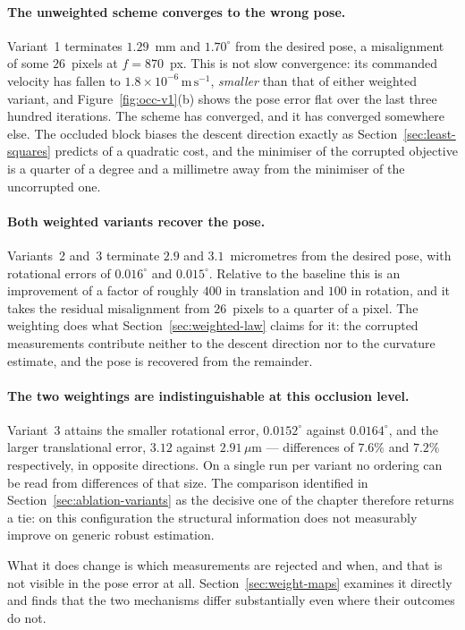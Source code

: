 \paragraph{The unweighted scheme converges to the wrong pose.}
Variant~1 terminates $1.29$~mm and $1.70^{\circ}$ from the desired pose, a
misalignment of some $26$~pixels at $f=870$~px. This is not slow convergence:
its commanded velocity has fallen to $1.8\times10^{-6}\,\mathrm{m\,s^{-1}}$,
\emph{smaller} than that of either weighted variant, and
Figure~\ref{fig:occ-v1}(b) shows the pose error flat over the last three
hundred iterations. The scheme has converged, and it has converged somewhere
else. The occluded block biases the descent direction exactly as
Section~\ref{sec:least-squares} predicts of a quadratic cost, and the
minimiser of the corrupted objective is a quarter of a degree and a millimetre
away from the minimiser of the uncorrupted one.

\paragraph{Both weighted variants recover the pose.}
Variants~2 and~3 terminate $2.9$ and $3.1$~micrometres from the desired pose,
with rotational errors of $0.016^{\circ}$ and $0.015^{\circ}$. Relative to the
baseline this is an improvement of a factor of roughly $400$ in translation
and $100$ in rotation, and it takes the residual misalignment from $26$~pixels
to a quarter of a pixel. The weighting does what Section~\ref{sec:weighted-law}
claims for it: the corrupted measurements contribute neither to the descent
direction nor to the curvature estimate, and the pose is recovered from the
remainder.

\paragraph{The two weightings are indistinguishable at this occlusion level.}
Variant~3 attains the smaller rotational error, $0.0152^{\circ}$ against
$0.0164^{\circ}$, and the larger translational error, $3.12$ against
$2.91\,\mu$m --- differences of $7.6\%$ and $7.2\%$ respectively, in opposite
directions. On a single run per variant no ordering can be read from
differences of that size. The comparison identified in
Section~\ref{sec:ablation-variants} as the decisive one of the chapter
therefore returns a tie: on this configuration the structural information does
not measurably improve on generic robust estimation.

What it does change is which measurements are rejected and when, and that is
not visible in the pose error at all. Section~\ref{sec:weight-maps} examines
it directly and finds that the two mechanisms differ substantially even where
their outcomes do not.

